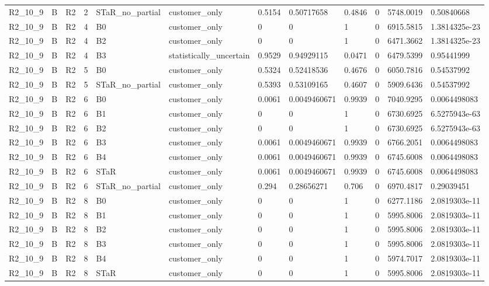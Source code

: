 \begin{longtable}{llllllllllll}
R2\_10\_9 & B & R2 & 2 & STaR\_no\_partial & customer\_only & 0.5154 & 0.50717658 & 0.4846 & 0 & 5748.0019 & 0.50840668 \\
R2\_10\_9 & B & R2 & 4 & B0 & customer\_only & 0 & 0 & 1 & 0 & 6915.5815 & 1.3814325e-23 \\
R2\_10\_9 & B & R2 & 4 & B2 & customer\_only & 0 & 0 & 1 & 0 & 6471.3662 & 1.3814325e-23 \\
R2\_10\_9 & B & R2 & 4 & B3 & statistically\_uncertain & 0.9529 & 0.94929115 & 0.0471 & 0 & 6479.5399 & 0.95441999 \\
R2\_10\_9 & B & R2 & 5 & B0 & customer\_only & 0.5324 & 0.52418536 & 0.4676 & 0 & 6050.7816 & 0.54537992 \\
R2\_10\_9 & B & R2 & 5 & STaR\_no\_partial & customer\_only & 0.5393 & 0.53109165 & 0.4607 & 0 & 5909.6436 & 0.54537992 \\
R2\_10\_9 & B & R2 & 6 & B0 & customer\_only & 0.0061 & 0.0049460671 & 0.9939 & 0 & 7040.9295 & 0.0064498083 \\
R2\_10\_9 & B & R2 & 6 & B1 & customer\_only & 0 & 0 & 1 & 0 & 6730.6925 & 6.5275943e-63 \\
R2\_10\_9 & B & R2 & 6 & B2 & customer\_only & 0 & 0 & 1 & 0 & 6730.6925 & 6.5275943e-63 \\
R2\_10\_9 & B & R2 & 6 & B3 & customer\_only & 0.0061 & 0.0049460671 & 0.9939 & 0 & 6766.2051 & 0.0064498083 \\
R2\_10\_9 & B & R2 & 6 & B4 & customer\_only & 0.0061 & 0.0049460671 & 0.9939 & 0 & 6745.6008 & 0.0064498083 \\
R2\_10\_9 & B & R2 & 6 & STaR & customer\_only & 0.0061 & 0.0049460671 & 0.9939 & 0 & 6745.6008 & 0.0064498083 \\
R2\_10\_9 & B & R2 & 6 & STaR\_no\_partial & customer\_only & 0.294 & 0.28656271 & 0.706 & 0 & 6970.4817 & 0.29039451 \\
R2\_10\_9 & B & R2 & 8 & B0 & customer\_only & 0 & 0 & 1 & 0 & 6277.1186 & 2.0819303e-11 \\
R2\_10\_9 & B & R2 & 8 & B1 & customer\_only & 0 & 0 & 1 & 0 & 5995.8006 & 2.0819303e-11 \\
R2\_10\_9 & B & R2 & 8 & B2 & customer\_only & 0 & 0 & 1 & 0 & 5995.8006 & 2.0819303e-11 \\
R2\_10\_9 & B & R2 & 8 & B3 & customer\_only & 0 & 0 & 1 & 0 & 5995.8006 & 2.0819303e-11 \\
R2\_10\_9 & B & R2 & 8 & B4 & customer\_only & 0 & 0 & 1 & 0 & 5974.7017 & 2.0819303e-11 \\
R2\_10\_9 & B & R2 & 8 & STaR & customer\_only & 0 & 0 & 1 & 0 & 5995.8006 & 2.0819303e-11 \\

\end{longtable}
